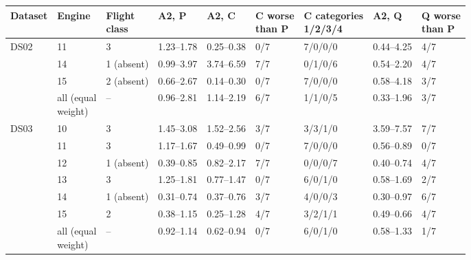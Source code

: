 \begin{tabular}{lllllllll}
\toprule
Dataset & Engine & \makecell{Flight\\class} & A2, P & A2, C & \makecell{C worse\\than P} & \makecell{C categories\\1/2/3/4} & A2, Q & \makecell{Q worse\\than P} \\
\midrule
DS02 & 11 & 3 & 1.23--1.78 & 0.25--0.38 & 0/7 & 7/0/0/0 & 0.44--4.25 & 4/7 \\
 & 14 & 1 (absent) & 0.99--3.97 & 3.74--6.59 & 7/7 & 0/1/0/6 & 0.54--2.20 & 4/7 \\
 & 15 & 2 (absent) & 0.66--2.67 & 0.14--0.30 & 0/7 & 7/0/0/0 & 0.58--4.18 & 3/7 \\
 & \makecell{all (equal\\weight)} & -- & 0.96--2.81 & 1.14--2.19 & 6/7 & 1/1/0/5 & 0.33--1.96 & 3/7 \\
\midrule
DS03 & 10 & 3 & 1.45--3.08 & 1.52--2.56 & 3/7 & 3/3/1/0 & 3.59--7.57 & 7/7 \\
 & 11 & 3 & 1.17--1.67 & 0.49--0.99 & 0/7 & 7/0/0/0 & 0.56--0.89 & 0/7 \\
 & 12 & 1 (absent) & 0.39--0.85 & 0.82--2.17 & 7/7 & 0/0/0/7 & 0.40--0.74 & 4/7 \\
 & 13 & 3 & 1.25--1.81 & 0.77--1.47 & 0/7 & 6/0/1/0 & 0.58--1.69 & 2/7 \\
 & 14 & 1 (absent) & 0.31--0.74 & 0.37--0.76 & 3/7 & 4/0/0/3 & 0.30--0.97 & 6/7 \\
 & 15 & 2 & 0.38--1.15 & 0.25--1.28 & 4/7 & 3/2/1/1 & 0.49--0.66 & 4/7 \\
 & \makecell{all (equal\\weight)} & -- & 0.92--1.14 & 0.62--0.94 & 0/7 & 6/0/1/0 & 0.58--1.33 & 1/7 \\
\bottomrule
\end{tabular}
